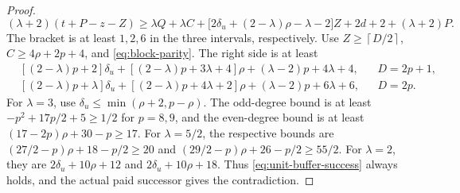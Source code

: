 \documentclass[11pt,a4paper]{article}
\newcommand{\ceil}[1]{\left\lceil#1\right\rceil}
\theoremstyle{definition}
\begin{document}
\begin{proof}
\[
(\lambda+2)(t+P-z-Z)
\ge\lambda Q+\lambda C+
\bigl[2\delta_u+(2-\lambda)\rho-\lambda-2\bigr]Z
 +2d+2+(\lambda+2)P.
\]
The bracket is at least $1,2,6$ in the three intervals, respectively.
Use $Z\ge\ceil{D/2}$, $C\ge4\rho+2p+4$, and \eqref{eq:block-parity}.
The right side is at least
\[
\begin{aligned}
&[(2-\lambda)p+2]\delta_u+
 [(2-\lambda)p+3\lambda+4]\rho+(\lambda-2)p+4\lambda+4,
 &&D=2p+1,\\
&[(2-\lambda)p+\lambda]\delta_u+
 [(2-\lambda)p+4\lambda+2]\rho+(\lambda-2)p+6\lambda+6,
 &&D=2p.
\end{aligned}
\]
For $\lambda=3$, use $\delta_u\le\min(\rho+2,p-\rho)$.
The odd-degree bound is at least $-p^2+17p/2+5\ge1/2$ for $p=8,9$, and the even-degree bound is at least $(17-2p)\rho+30-p\ge17$.
For $\lambda=5/2$, the respective bounds are
$(27/2-p)\rho+18-p/2\ge20$ and
$(29/2-p)\rho+26-p/2\ge55/2$.
For $\lambda=2$, they are $2\delta_u+10\rho+12$ and $2\delta_u+10\rho+18$.
Thus \eqref{eq:unit-buffer-success} always holds, and the actual paid successor gives the contradiction.
\end{proof}
\end{document}
